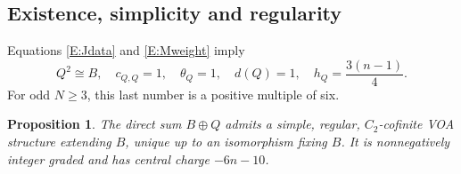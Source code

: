 \documentclass[11pt]{article}
\newtheorem{proposition}[theorem]{Proposition}
\numberwithin{equation}{section}
\begin{document}
\subsection{Existence, simplicity and regularity}
Equations \eqref{E:Jdata} and \eqref{E:Mweight} imply
\begin{equation}\label{E:Qdata}
Q^2\cong B,\quad c_{Q,Q}=1,\quad\theta_Q=1,\quad d(Q)=1,
\quad h_Q=\frac{3(n-1)}4.
\end{equation}
For odd $N\geq3$, this last number is a positive multiple of six.

\begin{proposition}\label{E:existence}
The direct sum $B\oplus Q$ admits a simple, regular, $C_2$-cofinite VOA structure extending $B$, unique up to an isomorphism fixing $B$. It is nonnegatively integer graded and has central charge $-6n-10$.
\end{proposition}
\end{document}
